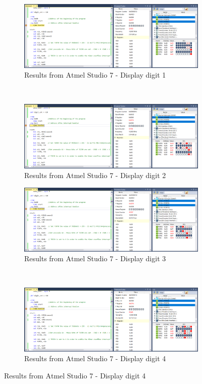 \documentclass{article}
\begin{document}
	\pagebreak
	\begin{figure}[h!]
		\centering
		\begin{subfigure}[t]{0.5\textwidth}
			\centering
			\includegraphics[width=\linewidth]{./results/lab2_sim_dig1.png}
			\caption{Results from Αtmel Studio 7 - Display digit 1}
		\end{subfigure}%
		~
		\begin{subfigure}[t]{0.5\textwidth}
			\centering
			\includegraphics[width=\linewidth]{./results/lab2_sim_dig2.png}
			\caption{Results from Αtmel Studio 7 - Display digit 2}
		\end{subfigure}%
		
		\begin{subfigure}[t]{0.5\textwidth}
			\centering
			\includegraphics[width=\linewidth]{./results/lab2_sim_dig3.png}
			\caption{Results from Αtmel Studio 7 - Display digit 3}
		\end{subfigure}%
		~
		\begin{subfigure}[t]{0.5\textwidth}
			\centering
			\includegraphics[width=\linewidth]{./results/lab2_sim_dig4.png}
			\caption{Results from Αtmel Studio 7 - Display digit 4}
		\end{subfigure}%
	

\end{figure}
\end{document}
